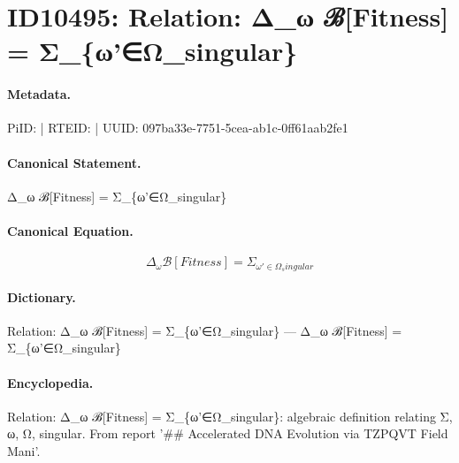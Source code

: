 \section*{ID10495: Relation: Δ\_ω ℬ[Fitness] = Σ\_\{ω'∈Ω\_singular\}}
\paragraph{Metadata.}
PiID:  | RTEID:  | UUID: 097ba33e-7751-5cea-ab1c-0ff61aab2fe1

\paragraph{Canonical Statement.}
Δ\_ω ℬ[Fitness] = Σ\_\{ω'∈Ω\_singular\}

\paragraph{Canonical Equation.}
\[
Δ_ω ℬ[Fitness] = Σ_{ω'∈Ω_singular}
\]

\paragraph{Dictionary.}
Relation: Δ\_ω ℬ[Fitness] = Σ\_\{ω'∈Ω\_singular\} — Δ\_ω ℬ[Fitness] = Σ\_\{ω'∈Ω\_singular\}

\paragraph{Encyclopedia.}
Relation: Δ\_ω ℬ[Fitness] = Σ\_\{ω'∈Ω\_singular\}: algebraic definition relating Σ, ω, Ω, singular. From report '\#\# Accelerated DNA Evolution via TZPQVT Field Mani'.
